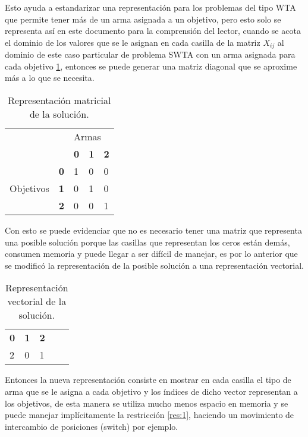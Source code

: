 Esto ayuda a estandarizar una representación para los problemas del tipo WTA que permite tener más de un arma asignada a un objetivo, pero esto solo se representa así en este documento para la comprensión del lector, cuando se acota el dominio de los valores que se le asignan en cada casilla de la matriz  $X_{ij}$ al dominio de este caso particular de problema SWTA con un arma asignada para cada objetivo \ref{fig:rep_sol_matrix_bin}, entonces se puede generar una matriz diagonal que se aproxime más a lo que se necesita.


\begin{table}[h!]
    \centering
    \begin{tabular}{ll|lll|}
    \cline{3-5}
     &  & \multicolumn{3}{l|}{Armas} \\ \cline{3-5} 
     &  & \multicolumn{1}{l|}{\textbf{0}} & \multicolumn{1}{l|}{\textbf{1}} & \textbf{2} \\ \hline
    \multicolumn{1}{|l|}{\multirow{3}{*}{Objetivos}} & \textbf{0} & 1 & 0 & 0 \\ \cline{2-2}
    \multicolumn{1}{|l|}{} & \textbf{1} & 0 & 1 & 0 \\ \cline{2-2}
    \multicolumn{1}{|l|}{} & \textbf{2} & 0 & 0 & 1 \\ \hline
    \end{tabular}
    \caption{Representación matricial de la solución.}
    \label{fig:rep_sol_matrix_bin}
\end{table}

Con esto se puede evidenciar que no es necesario tener una matriz que representa una posible solución porque las casillas que representan los ceros están demás, consumen memoria y puede llegar a ser difícil de manejar, es por lo anterior que se modificó la representación de la posible solución a una representación vectorial.

\begin{table}[h!]
\centering
\begin{tabular}{lllll}
\textbf{0}              & \textbf{1}             & \textbf{2}             &           &           \\ \cline{1-3}
\multicolumn{1}{|l|}{2} & \multicolumn{1}{l|}{0} & \multicolumn{1}{l|}{1} & \textbf{} & \textbf{} \\ \cline{1-3}      
\end{tabular}

\caption{Representación vectorial de la solución.}
\label{fig:rep_sol_vector}
\end{table}

Entonces la nueva representación consiste en mostrar en cada casilla el tipo de arma que se le asigna a cada objetivo y los índices de dicho vector representan a los objetivos, de esta manera se utiliza mucho menos espacio en memoria y se puede manejar implícitamente la restricción \ref{res:1}, haciendo un movimiento de intercambio de posiciones (switch) por ejemplo.